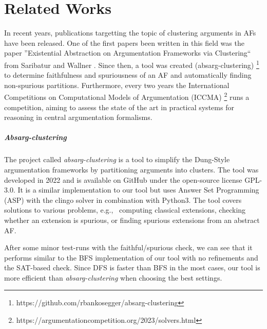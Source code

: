 \chapter{Related Works}
In recent years, publications targetting the topic of clustering arguments in AFs have been released. One of the first papers been written in this field was the paper ''Existential Abstraction on Argumentation Frameworks via Clustering`` from Saribatur and Wallner \cite{DBLP:conf/kr/SaribaturW21}. Since then, a tool was created (absarg-clustering) \footnote{https://github.com/rbankosegger/absarg-clustering} to determine faithfulness and spuriousness of an AF and automatically finding non-spurious partitions. Furthermore, every two years the International Competitions on Computational Models of Argumentation (ICCMA) \footnote{https://argumentationcompetition.org/2023/solvers.html} runs a competition, aiming to assess the state of the art in practical systems for reasoning in central argumentation formalisms.

\paragraph{Absarg-clustering} The project called \emph{absarg-clustering} is a tool to simplify the Dung-Style argumentation frameworks by partitioning arguments into clusters. The tool was developed in 2022 and is available on GitHub under the open-source license GPL-3.0. It is a similar implementation to our tool but uses Answer Set Programming (ASP) with the clingo solver \cite{gebser_et_al:OASIcs.ICLP.2016.2} in combination with Python3. The tool covers solutions to various problems, e.g., \ computing classical extensions, checking whether an extension is spurious, or finding spurious extensions from an abstract AF.

After some minor test-runs with the faithful/spurious check, we can see that it performs similar to the BFS implementation of our tool with no refinements and the SAT-based check. Since DFS is faster than BFS in the most cases, our tool is more efficient than \emph{absarg-clustering} when choosing the best settings.


